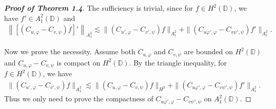 \documentclass[preprint,12pt,times]{elsarticle}
\theoremstyle{definition}
\theoremstyle{remark}
\numberwithin{equation}{section}
\begin{document}
\begin{proof}[{\bf Proof of Theorem 1.4}]
The sufficiency is trivial, since for $f\in H^2(\mathbb{D})$, we have $f'\in A_1^2(\mathbb{D})$ and 
\begin{align*}
\left\|\left[(C_{u,\varphi}-C_{v,\psi})f\right]'\right\|_{A_1^2}\lesssim \|(C_{u',\varphi}-C_{v',\psi})f\|_{A_1^2}+\|(C_{u\varphi',\varphi}-C_{v\psi',\psi})f'\|_{A_1^2}.
\end{align*}

Now we prove the necessity. Assume both $C_{u,\varphi}$ and $C_{v,\psi}$ are bounded on $H^2(\mathbb{D})$ and $C_{u,\varphi}-C_{v,\psi}$ is compact on $H^2(\mathbb{D})$. By the triangle inequality, for $f\in H^2(\mathbb{D})$, we have
\begin{align*}
\|(C_{u',\varphi}-C_{v',\psi})f\|_{A_1^2}\lesssim \|(C_{u,\varphi}-C_{v,\psi})f\|_{H^2}+\|(C_{u\varphi',\varphi}-C_{v\psi',\psi})f'\|_{A_1^2}.
\end{align*}
Thus we only need to prove the compactness of $C_{u\varphi',\varphi}-C_{v\psi',\psi}$ on $A_1^2(\mathbb{D})$.


\end{proof}
\end{document}
